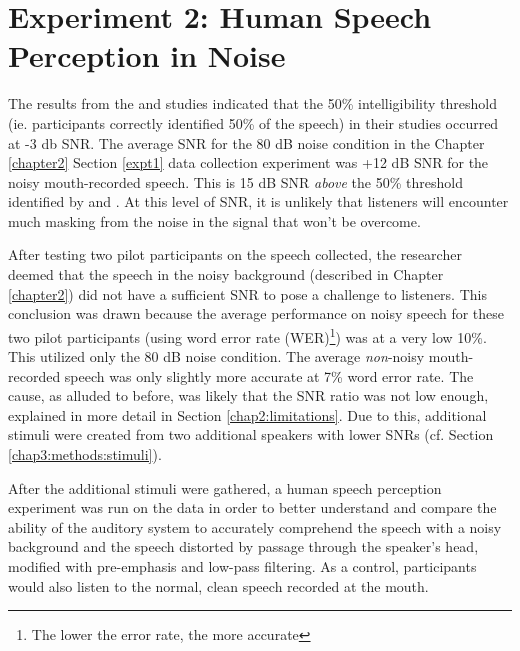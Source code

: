 


\section{Experiment 2: Human Speech Perception in Noise}
\label{expt2}

The results from the \cite{ding:13} and \cite{gilbert:13} studies indicated that the 50\% intelligibility threshold (ie. participants correctly identified 50\% of the speech) in their studies occurred at -3 db SNR.  The average SNR for the 80 dB noise condition in the Chapter \ref{chapter2} Section \ref{expt1} data collection experiment was +12 dB SNR for the noisy mouth-recorded speech.  This is 15 dB SNR \textit{above} the 50\% threshold identified by \cite{ding:13} and \cite{gilbert:13}.  At this level of SNR, it is unlikely that listeners will encounter much masking from the noise in the signal that won't be overcome.

After testing two pilot participants on the speech collected, the researcher deemed that the speech in the noisy background (described in Chapter \ref{chapter2}) did not have a sufficient SNR to pose a challenge to listeners.  This conclusion was drawn because the average performance on noisy speech for these two pilot participants (using word error rate (WER)\footnote{The lower the error rate, the more accurate}) was at a very low 10\%.  This utilized only the 80 dB noise condition.  The average \textit{non}-noisy mouth-recorded speech was only slightly more accurate at 7\% word error rate. The cause, as alluded to before, was likely that the SNR ratio was not low enough, explained in more detail in Section \ref{chap2:limitations}.  Due to this, additional stimuli were created from two additional speakers with lower SNRs (cf. Section \ref{chap3:methods:stimuli}).

After the additional stimuli were gathered, a human speech perception experiment was run on the data in order to better understand and compare the ability of the auditory system to accurately comprehend the speech with a noisy background and the speech distorted by passage through the speaker's head, modified with pre-emphasis and low-pass filtering.  As a control, participants would also listen to the normal, clean speech recorded at the mouth.

